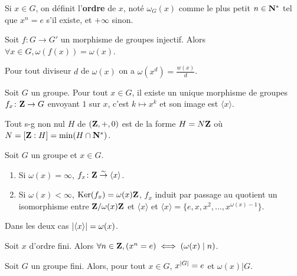 	\begin{defn}
		Si  $x \in G$, on définit l'\textbf{ordre} de $x$, noté $\omega_G(x)$ comme le plus petit $n \in \mathbf{N}^*$ tel que $x^n = e$ s'il existe, et $+\infty$ sinon.
	\end{defn}

	\begin{lem}
		Soit $f \colon G \to G'$ un morphisme de groupes injectif.
		Alors $\forall x \in G, \omega(f(x)) = \omega(x)$.
	\end{lem}

	\begin{lem}
		Pour tout diviseur $d$ de $\omega(x)$ on a $\omega(x^d) = \frac{w(x)}{d}$.
	\end{lem}

	\begin{lem}
		Soit $G$ un groupe.
		Pour tout $x \in G$, il existe un unique morphisme de groupes $f_x \colon \mathbf{Z} \to G$ envoyant $1$ sur $x$, c'est $k \mapsto x^k$ et son image est $\langle x \rangle$.
	\end{lem}

	\begin{lem}
		Tout s-g non nul $H$ de $(\mathbf{Z},+,0)$ est de la forme $H = N\mathbf{Z}$ où $N = [\mathbf{Z} : H] = \min(H \cap \mathbf{N}^*)$.
	\end{lem}

	\begin{pop}
		Soit $G$ un groupe et $x \in G$.
		\begin{enumerate}
			\item Si $\omega(x) = \infty$, $f_x \colon \mathbf{Z} \overset{\sim}{\to} \langle x \rangle$.
			\item Si $\omega(x) < \infty$, $\operatorname{Ker}(f_x) = \omega(x) \mathbf{Z}$, $f_x$ induit par passage au quotient un isomorphisme entre $\mathbf{Z} / \omega(x)\mathbf{Z}$ et $\langle x \rangle$ et $\langle x \rangle = \{ e, x, x^2, \ldots, x^{\omega(x) - 1} \}$.
		\end{enumerate}
		Dans les deux cas $\left\lvert\langle x \rangle\right\rvert = \omega(x)$.
	\end{pop}

	\begin{cor}
		Soit $x$ d'ordre fini.
		Alors $\forall n \in \mathbf{Z}, \left( x^n = e \right) \iff \left( \omega(x) \mid n \right)$.
	\end{cor}

	\begin{thm}
		Soit $G$ un groupe fini.
		Alors, pour tout $x \in G$, $x^{\left\lvert G\right\rvert} = e$ et $\omega(x) \vert G$.
	\end{thm}


